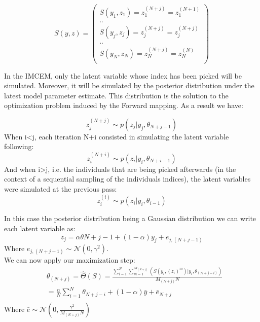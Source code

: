 \documentclass[a4paper]{article}
\theoremstyle{plain}
\theoremstyle{plain}
\theoremstyle{definition}
\begin{document}
\begin{equation}
S(y,z) = 
\left(
\begin{array}{c}
S(y_1,z_1) =z_1^{(N+j)}= z_1^{(N+1)}\\
..\\
S(y_j,z_j) =z_j^{(N+j)}= z_j^{(N+j)}\\
..\\
S(y_N,z_N) =z_N^{(N+j)}= z_N^{(N)}\\
\end{array}
\right)
\end{equation}

In the IMCEM, only the latent variable whose index has been picked will be simulated. Moreover, it will be simulated by the posterior distribution under the latest model parameter estimate. This distribution is the solution to the optimization problem induced by the Forward mapping. As a result we have:

\begin{equation}
z_j^{(N+j)} \sim p(z_j|y_j,\theta_{N+j-1})
\end{equation}
When i<j, each iteration N+i consisted in simulating the latent variable following:
\begin{equation}
z_i^{(N+i)} \sim p(z_i|y_i,\theta_{N+i-1})
\end{equation}
And when i>j, i.e. the individuals that are being picked afterwards (in the context of a sequential sampling of the individuals indices), the latent variables were simulated at the previous pass:
\begin{equation}
z_i^{(i)} \sim p(z_i|y_i,\theta_{i-1})
\end{equation}

In this case the posterior distribution being a Gaussian distribution we can write each latent variable as:
\begin{equation}
z_j = \alpha \theta{N+j-1} + (1-\alpha)y_j + e_{j,(N+j-1)}
\end{equation}
Where $e_{j,(N+j-1)} \sim \mathcal{N}(0, \gamma^2)$.\\

\noindent We can now apply our maximization step:
\begin{equation}
\begin{split}
& \theta_{(N+j)} = \hat{\Theta}(S) = \frac{\sum_{i=1}^{N}{\sum_{m=1}^{M_(N+j)}{(S(y_i,(z_i)^m)|y_i,\theta_{(N+j-i)})}}}{M_(N+j)N}\\
& = \frac{\alpha}{N} \sum_{i=1}^{N}{\theta_{N+j-i}} + (1-\alpha)\bar{y} + \bar{e}_{N+j}\\
\end{split}
\end{equation}
Where $\bar{e} \sim \mathcal{N}(0, \frac{\gamma^2}{M_(N+j)N})$
\end{document}
